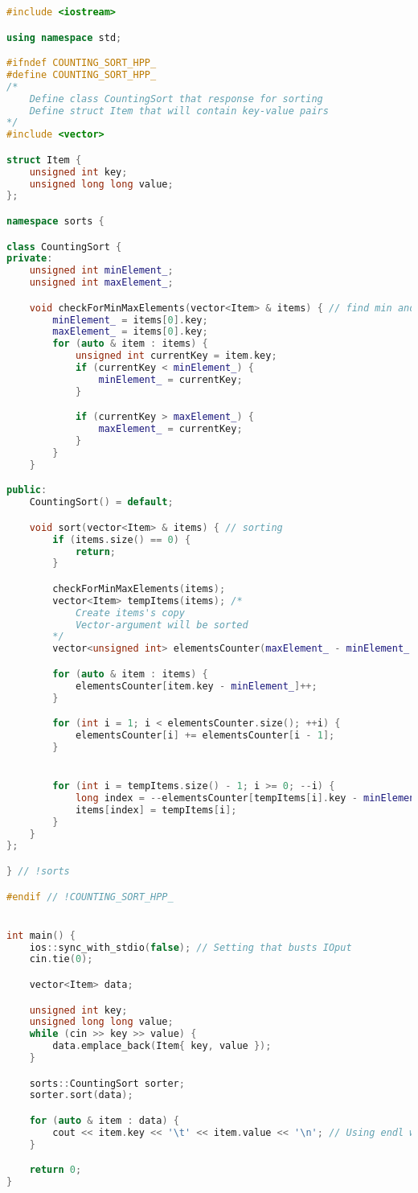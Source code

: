 \begin{lstlisting}[language=C++]
#include <iostream>

using namespace std;

#ifndef COUNTING_SORT_HPP_
#define COUNTING_SORT_HPP_
/*
    Define class CountingSort that response for sorting
    Define struct Item that will contain key-value pairs
*/
#include <vector>

struct Item {
    unsigned int key;
    unsigned long long value;
};

namespace sorts {

class CountingSort {
private:
    unsigned int minElement_;
    unsigned int maxElement_;

    void checkForMinMaxElements(vector<Item> & items) { // find min and max keys
        minElement_ = items[0].key;
        maxElement_ = items[0].key;
        for (auto & item : items) {
            unsigned int currentKey = item.key;
            if (currentKey < minElement_) {
                minElement_ = currentKey;
            }

            if (currentKey > maxElement_) {
                maxElement_ = currentKey;
            }
        }
    }

public:
    CountingSort() = default;

    void sort(vector<Item> & items) { // sorting
        if (items.size() == 0) {
            return;
        }

        checkForMinMaxElements(items);
        vector<Item> tempItems(items); /*
            Create items's copy 
            Vector-argument will be sorted
        */
        vector<unsigned int> elementsCounter(maxElement_ - minElement_ + 1);

        for (auto & item : items) {
            elementsCounter[item.key - minElement_]++;
        }

        for (int i = 1; i < elementsCounter.size(); ++i) {
            elementsCounter[i] += elementsCounter[i - 1];
        }


        for (int i = tempItems.size() - 1; i >= 0; --i) {
            long index = --elementsCounter[tempItems[i].key - minElement_];
            items[index] = tempItems[i];
        }
    }
};

} // !sorts

#endif // !COUNTING_SORT_HPP_


int main() {
    ios::sync_with_stdio(false); // Setting that busts IOput
    cin.tie(0);

    vector<Item> data;

    unsigned int key;
    unsigned long long value;
    while (cin >> key >> value) {
        data.emplace_back(Item{ key, value });
    }

    sorts::CountingSort sorter;
    sorter.sort(data);

    for (auto & item : data) {
        cout << item.key << '\t' << item.value << '\n'; // Using endl will call flush buffer so i use '\n'
    }

    return 0;
}	
\end{lstlisting}

